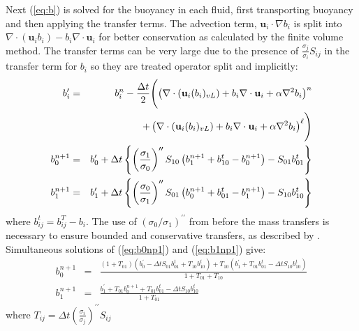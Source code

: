 \documentclass[draft]{agujournal2019}
\begin{document}
Next  (\ref{eq:b}) is solved for the buoyancy in each fluid, first
transporting buoyancy and then applying the transfer terms.
The advection term, $\mathbf{u}_i\cdot\nabla b_i$ is split into $\nabla\cdot(\mathbf{u}_i b_i) - b_i \nabla\cdot\mathbf{u}_i$ for better conservation as calculated by the finite volume method.
The transfer
terms can be very large due to the presence of $\frac{\sigma_{j}}{\sigma_{i}}S_{ij}$
in the transfer term for $b_{i}$ so they are treated operator split
and implicitly:
\begin{eqnarray}
b_{i}^{\prime} & = & b_{i}^{n}-\frac{\Delta t}{2}\Biggl(\left(\nabla\cdot\left(\mathbf{u}_{i}(b_{i})_{vL}\right)+b_{i}\nabla\cdot\mathbf{u}_{i}+\alpha\nabla^{2}b_{i}\right)^{n}\label{eq:transportb}\\
 &  & \hfill+\left(\nabla\cdot\left(\mathbf{u}_{i}(b_{i})_{vL}\right)+b_{i}\nabla\cdot\mathbf{u}_{i}+\alpha\nabla^{2}b_{i}\right)^{\ell}\Biggr)\\
b_{0}^{n+1} & = & b_{0}^{\prime}+\Delta t\left\{ \left(\frac{\sigma_{1}}{\sigma_{0}}\right)^{\prime\prime}S_{10}\left(b_{1}^{n+1}+b_{10}^{t}-b_{0}^{n+1}\right)-S_{01}b_{01}^{t}\right\} \label{eq:b0np1}\\
b_{1}^{n+1} & = & b_{1}^{\prime}+\Delta t\left\{ \left(\frac{\sigma_{0}}{\sigma_{1}}\right)^{\prime\prime}S_{01}\left(b_{0}^{n+1}+b_{01}^{t}-b_{1}^{n+1}\right)-S_{10}b_{10}^{t}\right\} \label{eq:b1np1}
\end{eqnarray}
where $b_{ij}^{t}=b_{ij}^{T}-b_{i}$. The use of $(\sigma_{0}/\sigma_{1})^{\prime\prime}$
from before the mass transfers is necessary to ensure bounded and
conservative transfers, as described by \cite{MWH20}. Simultaneous
solutions of (\ref{eq:b0np1}) and (\ref{eq:b1np1}) give:
\begin{eqnarray}
b_{0}^{n+1} & = & \frac{\left(1+T_{01}\right)\left(b_{0}^{\prime}-\Delta tS_{01}b_{01}^{t}+T_{10}b_{10}^{t}\right)+T_{10}\left(b_{1}^{\prime}+T_{01}b_{01}^{t}-\Delta tS_{10}b_{10}^{t}\right)}{1+T_{01}+T_{10}}\\
b_{1}^{n+1} & = & \frac{b_{1}^{\prime}+T_{01}b_{0}^{n+1}+T_{01}b_{01}^{t}-\Delta tS_{10}b_{10}^{t}}{1+T_{01}}
\end{eqnarray}
where $T_{ij}=\Delta t\left(\frac{\sigma_{i}}{\sigma_{j}}\right)^{\prime\prime}S_{ij}$
\end{document}
